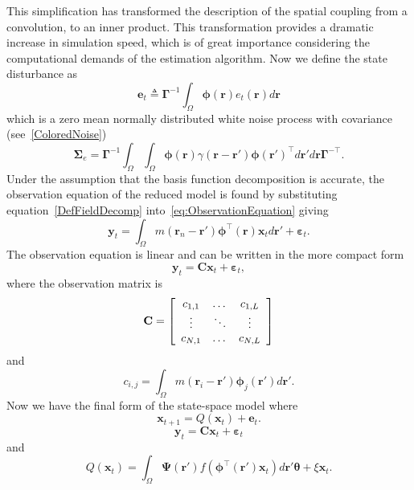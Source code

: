 \documentclass[10pt]{article}
\begin{document}
This simplification has transformed the description of the spatial coupling from a convolution, to an inner product. This transformation provides a dramatic increase in simulation speed, which is of great importance considering the computational demands of the estimation algorithm. Now we define the state disturbance as
\begin{equation}\label{eq:Wt} 
	\mathbf{e}_t \triangleq \boldsymbol{\Gamma}^{-1}\int_\Omega {\boldsymbol{\phi} ( \mathbf{r} )e_t( \mathbf{r} )d\mathbf{r}} 
\end{equation}
which is a zero mean normally distributed white noise process with covariance (see~\ref{ColoredNoise})
\begin{equation}
	\boldsymbol\Sigma_e =\mathbf{\Gamma}^{-1}\int_{\Omega}\int_{\Omega}\boldsymbol{\phi}\left(\mathbf r\right) \gamma\left(\mathbf r- \mathbf r' \right)\boldsymbol{\phi}\left(\mathbf r'\right)^{\top}d\mathbf r' d\mathbf r\mathbf{\Gamma}^{- \top}. 
\end{equation}
Under the assumption that the basis function decomposition is accurate, the observation equation of the reduced model is found by substituting equation~\ref{DefFieldDecomp} into~\ref{eq:ObservationEquation} giving
\begin{equation}\label{eq:ReducedObservationEquation}
	\mathbf{y}_t = \int_{\Omega}{m\left(\mathbf{r}_n-\mathbf{r}'\right)\boldsymbol{\phi}^{\top}\left(\mathbf{r}\right) \mathbf{x}_td\mathbf{r}'} + \boldsymbol{\varepsilon}_t. 
\end{equation}
The observation equation is linear and can be written in the more compact form
\begin{equation}\label{ObservationEquation} 
	\mathbf{y}_t = \mathbf{C}\mathbf{x}_t + \boldsymbol{\varepsilon}_t,
\end{equation}
where the observation matrix is 
\begin{equation}
	\mathbf{C} = \left[
	\begin{array}{{ccc}} 
		c_{1,1} & \dots & c_{1,L} \\
		\vdots & \ddots & \vdots \\
		c_{N,1} & \dots & c_{N,L} 
	\end{array}
	\right] 
\end{equation}
and 
\begin{equation}
	c_{i,j} = \int_{\Omega}m(\mathbf{r}_i - \mathbf{r}')\boldsymbol{\phi}_j(\mathbf{r}')d\mathbf{r}'. 
\end{equation}
Now we have the final form of the state-space model where
\begin{equation}\label{eq:finalformstatespacemodel}
	\mathbf{x}_{t+1} = Q(\mathbf{x}_t) +\mathbf{e}_t.
\end{equation}
\begin{equation} 
	\mathbf{y}_t = \mathbf{C}\mathbf{x}_t + \boldsymbol{\varepsilon}_t
\end{equation}
and 
\begin{equation}\label{eq:QmatrixForSigmapoints}
	Q(\mathbf{x}_t) = \int_\Omega \boldsymbol{\Psi}(\mathbf{r}') f(\boldsymbol{\phi}^{\top}(\mathbf{r}')\mathbf{x}_t) d\mathbf{r}' \boldsymbol{\theta} + \xi\mathbf{x}_t.
\end{equation}
\end{document}

